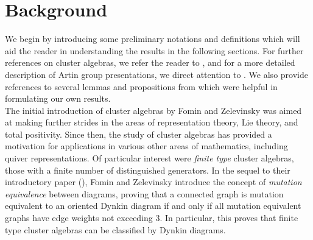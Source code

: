 \documentclass[11pt]{amsart}
\theoremstyle{definition}
\begin{document}
\section{Background}
\label{sec:main_definitions}

We begin by introducing some preliminary notations and definitions which will aid the reader in understanding the results in the following sections. For further references on cluster algebras, we refer the reader to \cite{FZ02, FZ03}, and for a more detailed description of Artin group presentations, we direct attention to \cite{FN61}. We also provide references to several lemmas and propositions from \cite{BM13} which were helpful in formulating our own results. \\

The initial introduction of cluster algebras by Fomin and Zelevinsky was aimed at making further strides in the areas of representation theory, Lie theory, and total positivity. Since then, the study of cluster algebras has provided a motivation for applications in various other areas of mathematics, including quiver representations. Of particular interest were \textit{finite type} cluster algebras, those with a finite number of distinguished generators. In the sequel to their introductory paper (\cite{FZ03}), Fomin and Zelevinsky introduce the concept of \textit{mutation equivalence} between diagrams, proving that a connected graph is mutation equivalent to an oriented Dynkin diagram if and only if all mutation equivalent graphs have edge weights not exceeding 3. In particular, this proves that finite type cluster algebras can be classified by Dynkin diagrams. \\
\end{document}
